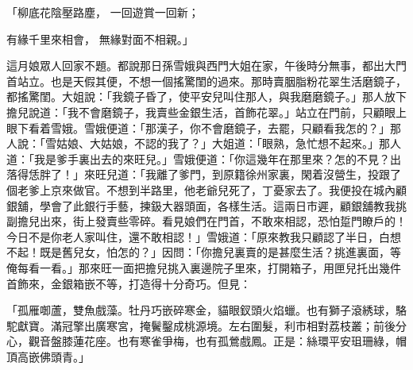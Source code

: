 「柳底花陰壓路塵，  一回遊賞一回新；

有緣千里來相會，  無緣對面不相親。」

這月娘眾人回家不題。都說那日孫雪娥與西門大姐在家，午後時分無事，都出大門首站立。也是天假其便，不想一個搖驚閨的過來。那時賣胭脂粉花翠生活磨鏡子，都搖驚閨。大姐說：「我鏡子昏了，使平安兒叫住那人，與我磨磨鏡子。」那人放下擔兒說道：「我不會磨鏡子，我賣些金銀生活，首飾花翠。」站立在門前，只顧眼上眼下看着雪娥。雪娥便道：「那漢子，你不會磨鏡子，去罷，只顧看我怎的？」那人說：「雪姑娘、大姑娘，不認的我了？」大姐道：「眼熟，急忙想不起來。」那人道：「我是爹手裏出去的來旺兒。」雪娥便道：「你這幾年在那里來？怎的不見？出落得恁胖了！」來旺兒道：「我離了爹門，到原籍徐州家裏，閑着沒營生，投跟了個老爹上京來做官。不想到半路里，他老爺兒死了，丁憂家去了。我便投在城內顧銀舖，學會了此銀行手藝，揀鈒大器頭面，各樣生活。這兩日市遲，顧銀舖教我挑副擔兒出來，街上發賣些零碎。看見娘們在門首，不敢來相認，恐怕踅門瞭戶的！今日不是你老人家叫住，還不敢相認！」雪娥道：「原來教我只顧認了半日，白想不起！既是舊兒女，怕怎的？」因問：「你擔兒裏賣的是甚麼生活？挑進裏面，等俺每看一看。」那來旺一面把擔兒挑入裏邊院子里來，打開箱子，用匣兒托出幾件首飾來，金銀箱嵌不等，打造得十分奇巧。但見：

「孤雁啣蘆，雙魚戲藻。牡丹巧嵌碎寒金，貓眼釵頭火焰蠟。也有獅子滾綉球，駱駝獻寶。滿冠擎出廣寒宮，掩鬢鑿成桃源境。左右圍髮，利市相對荔枝叢；前後分心，觀音盤膝蓮花座。也有寒雀爭梅，也有孤鶯戲鳳。正是：絲環平安珇珊綠，帽頂高嵌佛頭青。」

